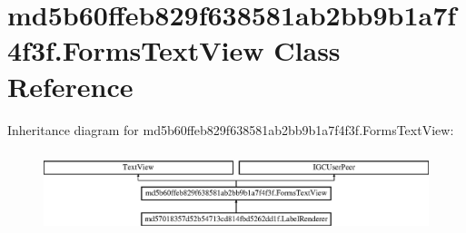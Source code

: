 \hypertarget{classmd5b60ffeb829f638581ab2bb9b1a7f4f3f_1_1FormsTextView}{}\section{md5b60ffeb829f638581ab2bb9b1a7f4f3f.\+Forms\+Text\+View Class Reference}
\label{classmd5b60ffeb829f638581ab2bb9b1a7f4f3f_1_1FormsTextView}
Inheritance diagram for md5b60ffeb829f638581ab2bb9b1a7f4f3f.\+Forms\+Text\+View\+:\begin{figure}[H]
\begin{center}
\leavevmode
\includegraphics[height=2.406877cm]{classmd5b60ffeb829f638581ab2bb9b1a7f4f3f_1_1FormsTextView}
\end{center}
\end{figure}
